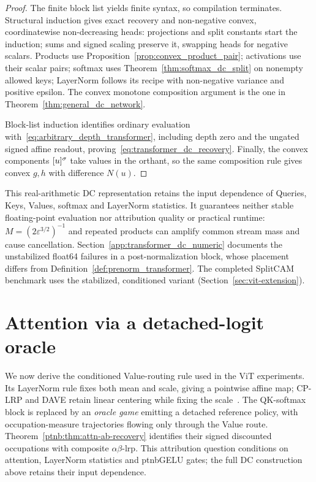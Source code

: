 \begin{proof}
The finite block list yields finite syntax, so compilation terminates. Structural induction gives exact recovery and non-negative convex, coordinatewise non-decreasing heads: projections and split constants start the induction; sums and signed scaling preserve it, swapping heads for negative scalars. Products use Proposition~\ref{prop:convex_product_pair}; activations use their scalar pairs; softmax uses Theorem~\ref{thm:softmax_dc_split} on nonempty allowed keys; LayerNorm follows its recipe with non-negative variance and positive epsilon. The convex monotone composition argument is the one in Theorem~\ref{thm:general_dc_network}.

Block-list induction identifies ordinary evaluation with~\eqref{eq:arbitrary_depth_transformer}, including depth zero and the ungated signed affine readout, proving~\eqref{eq:transformer_dc_recovery}. Finally, the convex components $[u]^{\sigma}$ take values in the orthant, so the same composition rule gives convex $g,h$ with difference $N(u)$.
\end{proof}

This real-arithmetic DC representation retains the input dependence of Queries, Keys, Values, softmax and LayerNorm statistics. It guarantees neither stable floating-point evaluation nor attribution quality or practical runtime: $M=(2\varepsilon^{3/2})^{-1}$ and repeated products can amplify common stream mass and cause cancellation. Section~\ref{app:transformer_dc_numeric} documents the unstabilized float64 failures in a post-normalization block, whose placement differs from Definition~\ref{def:prenorm_transformer}. The completed SplitCAM benchmark uses the stabilized, conditioned variant (Section~\ref{sec:vit-extension}).

\section{Attention via a detached-logit oracle}\label{ptnb:sec:attention}\label{ptnb:app:vit-extension}\label{sec:attention_routing_game}\label{ptnb:app:attention-subgame}\label{app:supp_attention}

We now derive the conditioned Value-routing rule used in the ViT experiments. Its LayerNorm rule fixes both mean and scale, giving a pointwise affine map; CP-LRP and DAVE retain linear centering while fixing the scale~\parencite{Ali2022AttnLRP,Wrobel2024}. The QK-softmax block is replaced by an \emph{oracle game} emitting a detached reference policy, with occupation-measure trajectories flowing only through the Value route. Theorem~\ref{ptnb:thm:attn-ab-recovery} identifies their signed discounted occupations with composite $\alpha\beta$-\ac{lrp}. This attribution question conditions on attention, LayerNorm statistics and \acs{ptnbGELU} gates; the full DC construction above retains their input dependence.

